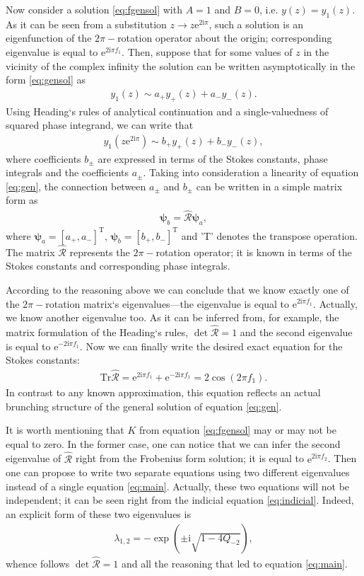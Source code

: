 \documentclass[aip,jmp,reprint]{revtex4-1}
\def\rmi{\mathrm{i}}
\def\rme{\mathrm{e}}
\def\psii{\bm\psi}
\def\R{\widehat{\mathcal{R}}}
\def\T{\mathrm{T}}
\def\Tr{\mathrm{Tr}}
\begin{document}
Now consider a solution \eqref{eq:fgensol} with $A=1$ and $B=0$, i.e. $y(z)=y_1(z)$. 
As it can be seen from a substitution \mbox{$z \rightarrow z \rme^{2 \rmi \pi}$}, 
such a solution is an eigenfunction of the $2\pi-$rotation operator about the origin; 
corresponding eigenvalue is equal to $\rme^{2 \rmi \pi f_1}$.  
Then, suppose that for some values of $z$ in the vicinity of the complex infinity 
the solution can be written asymptotically in the form \eqref{eq:gensol} as
\begin{eqnarray}
y_1(z) \sim a_+y_+(z) + a_-y_-(z).
\end{eqnarray}
Using Heading`s rules of analytical continuation\cite{heading, rwbook} and a single-valuedness 
of squared phase integrand, we can write that
\begin{eqnarray}
y_1(z \rme^{2 \rmi \pi}) \sim b_+y_+(z) + b_-y_-(z),
\end{eqnarray}
where coefficients $b_{\pm}$ are expressed in terms of the Stokes constants, phase integrals and 
the coefficients $a_{\pm}$. Taking into consideration a linearity of equation \eqref{eq:gen}, 
the connection between $a_{\pm}$ and $b_{\pm}$ can be written in a simple matrix form as
\begin{eqnarray}
\psii_b = \R \psii_a,
\end{eqnarray}
where $\psii_a = [{a_+,a_-}]^{\T}$, $\psii_b = [{b_+,b_-}]^{\T}$ and 'T' denotes the transpose operation.
The matrix $\R$ represents the $2\pi-$rotation operator; it is known in terms of
the Stokes constants and corresponding phase integrals. 

According to the reasoning above we can conclude
that we know exactly one of the $2\pi-$rotation matrix`s eigenvalues---the eigenvalue is 
equal to $\rme^{2 \rmi \pi f_1}$. Actually, we know another eigenvalue too. 
As it can be inferred from, for example, the matrix formulation 
of the Heading`s rules\cite{aksymm}, $\det\R=1$ and the second eigenvalue is equal 
to $\rme^{-2 \rmi \pi f_1}$. Now we can finally write the desired exact equation for the Stokes constants:
\begin{eqnarray}
\Tr\R = \rme^{2 \rmi \pi f_1} + \rme^{-2 \rmi \pi f_1} = 2 \cos(2 \pi f_1).
\label{eq:main}
\end{eqnarray}
In contrast to any known approximation, this equation reflects an actual brunching structure 
of the general solution of equation \eqref{eq:gen}.

It is worth mentioning that $K$ from equation \eqref{eq:fgensol} may or may not be equal to zero. In the
former case, one can notice that we can infer the second eigenvalue of $\R$ right from the
Frobenius form solution; it is equal to $\rme^{2 \rmi \pi f_2}$. Then one can propose to write two
separate equations using two different eigenvalues instead of a single equation \eqref{eq:main}.
Actually, these two equations will not be independent; it can be seen right from the
indicial equation \eqref{eq:indicial}. Indeed, an explicit form of these two eigenvalues is
\begin{eqnarray}
\lambda_{1,2} = - \exp(\pm \rmi \sqrt{1 - 4 Q_{-2}}),
\end{eqnarray}
whence follows $\det\R=1$ and all the reasoning that led to equation \eqref{eq:main}.
\end{document}
